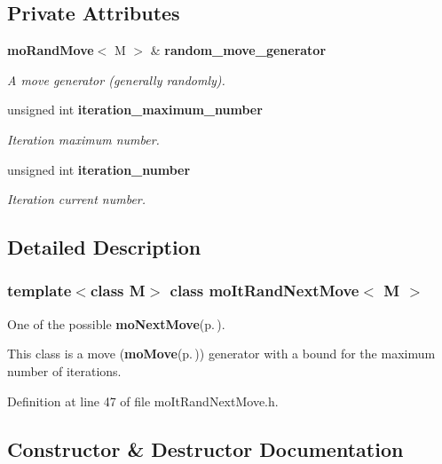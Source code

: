 \subsection*{Private Attributes}
\begin{CompactItemize}
\item 
{\bf mo\-Rand\-Move}$<$ M $>$ \& {\bf random\_\-move\_\-generator}\label{classmo_it_rand_next_move_r0}

\begin{CompactList}\small\item\em A move generator (generally randomly). \item\end{CompactList}\item 
unsigned int {\bf iteration\_\-maximum\_\-number}\label{classmo_it_rand_next_move_r1}

\begin{CompactList}\small\item\em Iteration maximum number. \item\end{CompactList}\item 
unsigned int {\bf iteration\_\-number}\label{classmo_it_rand_next_move_r2}

\begin{CompactList}\small\item\em Iteration current number. \item\end{CompactList}\end{CompactItemize}


\subsection{Detailed Description}
\subsubsection*{template$<$class M$>$ class mo\-It\-Rand\-Next\-Move$<$ M $>$}

One of the possible {\bf mo\-Next\-Move}{\rm (p.\,\pageref{classmo_next_move})}. 

This class is a move ({\bf mo\-Move}{\rm (p.\,\pageref{classmo_move})}) generator with a bound for the maximum number of iterations. 



Definition at line 47 of file mo\-It\-Rand\-Next\-Move.h.

\subsection{Constructor \& Destructor Documentation}
